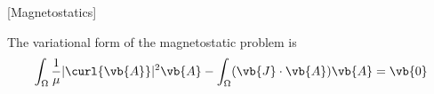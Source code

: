 \documentclass{notes}
\begin{document}
\author{Michael Haynes}
[Magnetostatics]
\date{2020-12-28}
\maketitle

\begin{proposition}
				The variational form of the magnetostatic problem is
				\[
					\int_{ \Omega }^{  }  \dfrac{1}{\mu} |\curl{\vb{A}}|^2 \vb{A} - \int_{ \Omega }^{  } (\vb{J} \cdot \vb{A}) \vb{A} = \vb{0} 
				\] 
\end{proposition}
\end{document}
